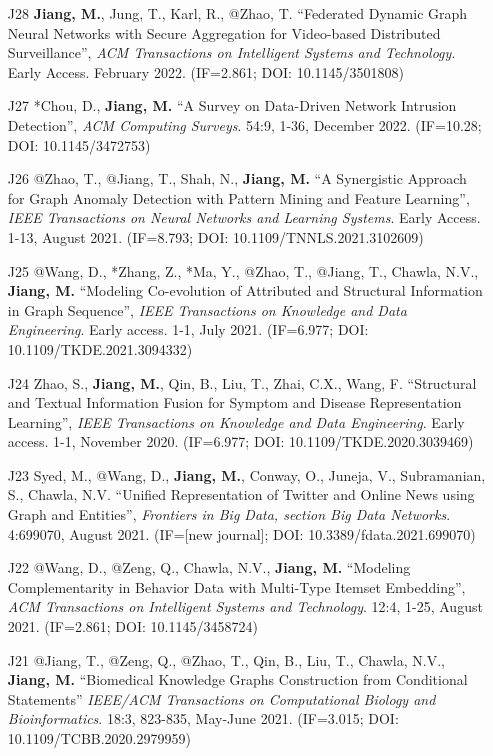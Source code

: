 \documentclass[10pt]{article}
\newenvironment{myindentpar}[1]%
{\begin{list}{}%
         {\setlength{\leftmargin}{#1}}%
         \item[]%
}
{\end{list}}
\newcounter{list}
\begin{document}
\begin{myindentpar}{0.00cm}
\begin{enumerate}[leftmargin=.5cm]
\item[J28] \textbf{Jiang, M.}, Jung, T., Karl, R., @Zhao, T. ``Federated Dynamic Graph Neural Networks with Secure Aggregation for Video-based Distributed Surveillance'', \textit{ACM Transactions on Intelligent Systems and Technology}. Early Access. February 2022. (IF=2.861; DOI: 10.1145/3501808)

\item[J27] *Chou, D., \textbf{Jiang, M.} ``A Survey on Data-Driven Network Intrusion Detection'', \textit{ACM Computing Surveys}. 54:9, 1-36, December 2022. (IF=10.28; DOI: 10.1145/3472753)

\item[J26] @Zhao, T., @Jiang, T., Shah, N., \textbf{Jiang, M.} ``A Synergistic Approach for Graph Anomaly Detection with Pattern Mining and Feature Learning'', \textit{IEEE Transactions on Neural Networks and Learning Systems}. Early Access. 1-13, August 2021. (IF=8.793; DOI: 10.1109/TNNLS.2021.3102609)

\item[J25] @Wang, D., *Zhang, Z., *Ma, Y., @Zhao, T., @Jiang, T., Chawla, N.V., \textbf{Jiang, M.} ``Modeling Co-evolution of Attributed and Structural Information in Graph Sequence'', \textit{IEEE Transactions on Knowledge and Data Engineering}. Early access. 1-1, July 2021. (IF=6.977; DOI: 10.1109/TKDE.2021.3094332)

\item[J24] Zhao, S., \textbf{Jiang, M.}, Qin, B., Liu, T., Zhai, C.X., Wang, F. ``Structural and Textual Information Fusion for Symptom and Disease Representation Learning'', \textit{IEEE Transactions on Knowledge and Data Engineering}. Early access. 1-1, November 2020. (IF=6.977; DOI: 10.1109/TKDE.2020.3039469)

\item[J23] Syed, M., @Wang, D., \textbf{Jiang, M.}, Conway, O., Juneja, V., Subramanian, S., Chawla, N.V. ``Unified Representation of Twitter and Online News using Graph and Entities'', \textit{Frontiers in Big Data, section Big Data Networks}. 4:699070, August 2021. (IF=[new journal]; DOI: 10.3389/fdata.2021.699070)

\item[J22] @Wang, D., @Zeng, Q., Chawla, N.V., \textbf{Jiang, M.} ``Modeling Complementarity in Behavior Data with Multi-Type Itemset Embedding'', \textit{ACM Transactions on Intelligent Systems and Technology}. 12:4, 1-25, August 2021. (IF=2.861; DOI: 10.1145/3458724)

\item[J21] @Jiang, T., @Zeng, Q., @Zhao, T., Qin, B., Liu, T., Chawla, N.V., \textbf{Jiang, M.} ``Biomedical Knowledge Graphs Construction from Conditional Statements'' \textit{IEEE/ACM Transactions on Computational Biology and Bioinformatics}. 18:3, 823-835, May-June 2021. (IF=3.015; DOI: 10.1109/TCBB.2020.2979959)


\end{enumerate}
\end{myindentpar}
\end{document}
